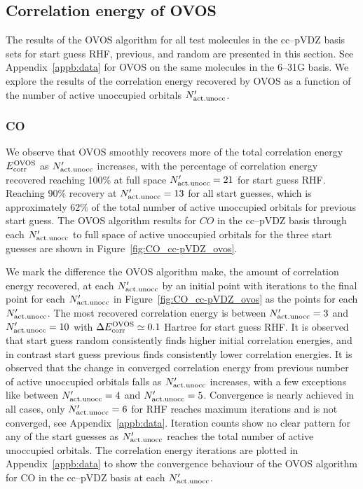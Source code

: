 \subsection{Correlation energy of OVOS}
\label{subsec:results_ovos_mp2}
The results of the OVOS algorithm for all test molecules in the cc--pVDZ basis sets for start guess RHF, previous, and random are presented in this section. See Appendix~\ref{appb:data} for OVOS on the same molecules in the 6--31G basis. We explore the results of the correlation energy recovered by OVOS as a function of the number of active unoccupied orbitals $N'_{\rm act.unocc}$.  


\subsubsection*{CO}

We observe that OVOS smoothly recovers more of the total correlation energy $E_{\rm corr}^{\rm OVOS}$ as $N'_{\rm act.unocc}$ increases, with the percentage of correlation energy recovered reaching 100\% at full space $N'_{\rm act.unocc} = 21$ for start guess RHF. Reaching 90\% recovery at $N'_{\rm act.unocc} = 13$ for all start guesses, which is approximately 62\% of the total number of active unoccupied orbitals for previous start guess. The OVOS algorithm results for $CO$ in the cc--pVDZ basis through each $N'_{\rm act.unocc}$ to full space of active unoccupied orbitals for the three start guesses are shown in Figure~\ref{fig:CO_cc-pVDZ_ovos}.

We mark the difference the OVOS algorithm make, the amount of correlation energy recovered, at each $N'_{\rm act.unocc}$ by an initial point with iterations to the final point for each $N'_{\rm act.unocc}$ in Figure~\ref{fig:CO_cc-pVDZ_ovos} as the points for each $N'_{\rm act.unocc}$. The most recovered correlation energy is between $N'_{\rm act.unocc} = 3$ and $N'_{\rm act.unocc} = 10$ with $\Delta E_{\rm corr}^{\rm OVOS} \simeq 0.1$ Hartree for start guess RHF. It is observed that start guess random consistently finds higher initial correlation energies, and in contrast start guess previous finds consistently lower correlation energies. It is observed that the change in converged correlation energy from previous number of active unoccupied orbitals falls as $N'_{\rm act.unocc}$ increases, with a few exceptions like between $N'_{\rm act.unocc} = 4$ and $N'_{\rm act.unocc} = 5$. Convergence is nearly achieved in all cases, only $N'_{\rm act.unocc} = 6$ for RHF reaches maximum iterations and is not converged, see Appendix~\ref{appb:data}. Iteration counts show no clear pattern for any of the start guesses as $N'_{\rm act.unocc}$ reaches the total number of active unoccupied orbitals. The correlation energy iterations are plotted in Appendix~\ref{appb:data} to show the convergence behaviour of the OVOS algorithm for CO in the cc--pVDZ basis at each $N'_{\rm act.unocc}$.

